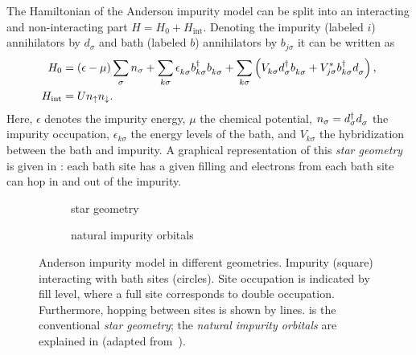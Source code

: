 The Hamiltonian of the Anderson impurity model \cite{Anderson1961} can be split into
an interacting and non-interacting part $H = H_0 + H_\mathrm{int}$.
Denoting the impurity (labeled $i$) annihilators by $d_\sigma$
and bath (labeled $b$) annihilators by $b_{j\sigma}$
it can be written as
\begin{align}
    H_0
     & =
    (\epsilon - \mu) \sum_{\pk\sigma} n_\sigma
    +
    \sum_{k\sigma} \epsilon_{k\sigma}^{\pdag} b^\dag_{k\sigma} b^{\pdag}_{k\sigma}
    +
    \sum_{k\sigma} \left(V^{\ps}_{k\sigma} d^\dag_{\pk\sigma} b^{\pdag}_{k\sigma}
    + V_{j\sigma}^* b^\dag_{k\sigma} d^{\pdag}_{\pk\sigma} \right),
    \\
    H_\mathrm{int}
     & =
    U n_\uparrow n_\downarrow.
    \label{eq:anderson-interaction}
\end{align}
Here,
$\epsilon$ denotes the impurity energy,
$\mu$ the chemical potential,
$n_\sigma = d^\dag_\sigma d^{\pdag}_\sigma$ the impurity occupation,
$\epsilon_{k\sigma}$ the energy levels of the bath,
and $V_{k\sigma}$ the hybridization between the bath and impurity.
A graphical representation of this \emph{star geometry} is given in :
each bath site has a given filling
and electrons from each bath site can hop in and out of the impurity.

\begin{figure}[ht]
    \centering
    \savebox{\imagebox}{} %
    \begin{subfigure}{0.45\textwidth}
        \centering
        \usebox{\imagebox}
        \caption{star geometry}
        \label{subfig:geometry-star}
    \end{subfigure}
    \begin{subfigure}{0.45\textwidth}
        \centering
        \raisebox{\dimexpr0.5\ht\imagebox-0.5\height}
        {
            
        }
        \caption{natural impurity orbitals}
        \label{subfig:geometry-natural-impurity-orbitals}
    \end{subfigure}
    \caption{
        Anderson impurity model in different geometries.
        Impurity (square) interacting with bath sites (circles).
        Site occupation is indicated by fill level,
        where a full site corresponds to double occupation.
        Furthermore, hopping between sites is shown by lines.
         is the conventional \emph{star geometry};
         the \emph{natural impurity orbitals}
        are explained in 
        (adapted from~\cite{Lu2019}).
    }
\end{figure}

